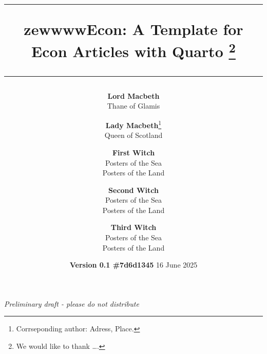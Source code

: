 \documentclass[12pt,a4paper,oneside]{article} %
\begin{document}

\setlength{\droptitle}{-8em}  %
	\title{	\rule{\linewidth}{0.5mm} \textbf{
		{\LARGE zewwwwEcon: A Template for Econ Articles with
Quarto \vspace{-15pt} }}\thanks{\noindent { }We would like to thank
\ldots.}  \rule{\linewidth}{0.5mm}  }
\date{\hspace{87pt}\scriptsize{\textbf{Version
0.1 \#7d6d1345}} \vspace{-5pt} \newline  \normalsize 16 June 2025} 

\author{
		\textbf{Lord Macbeth}\\
	\small{Thane of Glamis}\vspace{-1.5ex}\\
	\and	\textbf{Lady Macbeth}\thanks{ { }Corrseponding author: Adress,
Place.}\\
	\small{Queen of Scotland}\vspace{-1.5ex}\\
	\and	\textbf{First Witch}\\
	\small{Posters of the Sea}\vspace{-1.5ex}\\
	\small{Posters of the Land}\vspace{-1.5ex}\\
	\and	\textbf{Second Witch}\\
	\small{Posters of the Sea}\vspace{-1.5ex}\\
	\small{Posters of the Land}\vspace{-1.5ex}\\
	\and	\textbf{Third Witch}\\
	\small{Posters of the Sea}\vspace{-1.5ex}\\
	\small{Posters of the Land}\vspace{-1.5ex}\\
	\vspace{10pt}}

\maketitle
\thispagestyle{empty}

\begin{center}
\vspace{-25pt}	\noindent \textit{Preliminary draft - please do not
distribute}
\end{center}
\end{document}
